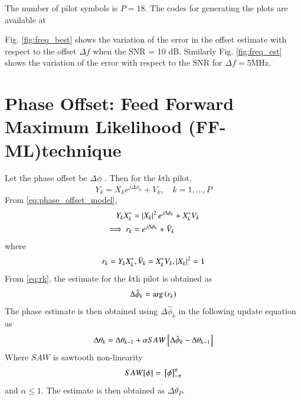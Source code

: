 \documentclass[journal,12pt,twocolumn]{IEEEtran}
\begin{document}
%
The number of pilot symbols is $P = 18$. The codes for generating the plots are available at

Fig. \ref{fig:freq_best} shows the variation of the error in the offset estimate with respect to the offset 
$\Delta f$ when the SNR = 10 dB.  Similarly Fig. \ref{fig:freq_est} shows the variation of the error with 
respect 
to the SNR for $\Delta f = 5 $MHz.


\section{Phase Offset: Feed Forward Maximum Likelihood (FF-ML)technique}
Let the phase offset be 
$\Delta\phi$  
\cite{phase_offset}
.  
Then for the $k$th pilot,
\begin{equation}
\label{eq:phase_offset_model}
Y_k= X_k e^{j\Delta\phi_k} + V_k, \quad k = 1,\dots,P
\end{equation}  
From \eqref{eq:phase_offset_model},
%
\begin{align}
Y_kX_k^*&= \left\vert X_k\right\vert^2e^{j \Delta\phi_k}+ X_k^*{V}_k\\
\implies r_k&=e^{j\Delta\phi_k}+ \bar{V}_k
\label{eq:rk}
\end{align}
where
\begin{align}
r_k=Y_kX_k^*, \bar{V}_k=X_k^*{V}_k, \left\vert X_k\right\vert^2=1
\end{align}
From \eqref{eq:rk}, the estimate for the $k$th pilot is obtained as
\begin{equation}
\label{eq:phase_estimation}
\Delta\hat{\phi}_k  = \arg\left(r_k\right)
\end{equation} 
%
The phase estimate is then obtained using $\Delta\hat{\phi}_k $ in the following update equation as
\begin{equation}
\Delta\theta_k =\Delta\theta_{k-1} + \alpha{SAW}{}\left[\Delta\hat{\phi}_k
-\Delta\theta_{k-1}\right]
\end{equation}
%
Where $SAW$ is sawtooth non-linearity 
\begin{equation}
 SAW[\phi]={}\left[\phi\right]^{\pi}_{-\pi}
\end{equation} 
and $\alpha \leq 1$. The estimate is then obtained as $\Delta\theta_{P}$.
 
\end{document}
